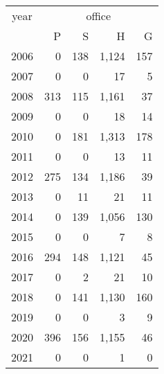 \footnotesize\begin{tabular}[t]{lrrrr}
\toprule
\multicolumn{1}{c}{year} & \multicolumn{4}{c}{office} \\
\cmidrule(l{3pt}r{3pt}){1-1} \cmidrule(l{3pt}r{3pt}){2-5}
  & P & S & H & G\\
\midrule
2006 & 0 & 138 & 1,124 & 157\\
2007 & 0 & 0 & 17 & 5\\
2008 & 313 & 115 & 1,161 & 37\\
2009 & 0 & 0 & 18 & 14\\
2010 & 0 & 181 & 1,313 & 178\\
2011 & 0 & 0 & 13 & 11\\
2012 & 275 & 134 & 1,186 & 39\\
2013 & 0 & 11 & 21 & 11\\
2014 & 0 & 139 & 1,056 & 130\\
2015 & 0 & 0 & 7 & 8\\
2016 & 294 & 148 & 1,121 & 45\\
2017 & 0 & 2 & 21 & 10\\
2018 & 0 & 141 & 1,130 & 160\\
2019 & 0 & 0 & 3 & 9\\
2020 & 396 & 156 & 1,155 & 46\\
2021 & 0 & 0 & 1 & 0\\
\bottomrule
\end{tabular}
